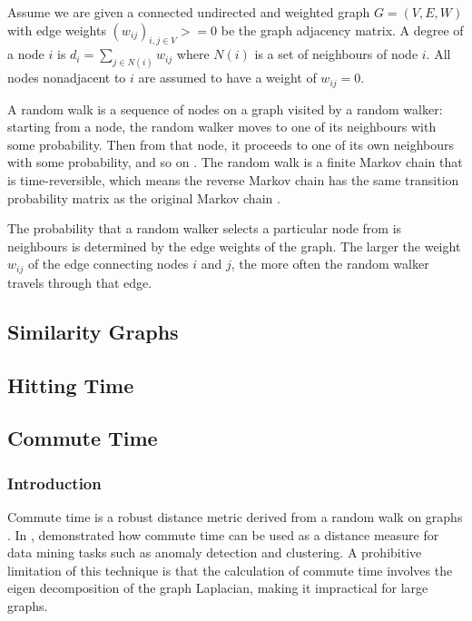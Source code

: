 Assume we are given a connected undirected and weighted graph $G=(V,E,W)$ with
edge weights $(w_{ij})_{i,j \in V}>=0$ be the graph adjacency matrix. A degree
of a node $i$ is $d_i=\sum_{j\in N(i)}w_{ij}$ where $N(i)$ is a set of
neighbours of node $i$. All nodes nonadjacent to $i$ are assumed to have a
weight of $w_{ij}=0$.

A random walk is a sequence of nodes on a graph visited by a random walker:
starting from a node, the random walker moves to one of its neighbours with some
probability. Then from that node, it proceeds to one of its own neighbours with
some probability, and so on \cite{Khoa:2012}. The random walk is a finite Markov
chain that is time-reversible, which means the reverse Markov chain has the same
transition probability matrix as the original Markov chain \cite{Lovasz:1996}.

The probability that a random walker selects a particular node from is
neighbours is determined by the edge weights of the graph. The larger the weight
$w_{ij}$ of the edge connecting nodes $i$ and $j$, the more often the random
walker travels through that edge.

\subsection{Similarity Graphs}
\label{similarityGraphs}

\subsection{Hitting Time}
\label{hittingTime}

\subsection{Commute Time}
\label{commuteTime}

\subsubsection{Introduction}
\label{commuteTime:introduction}
Commute time is a robust distance metric derived from a random walk on graphs
\cite{Khoa:2012}. In , \citeauthor{Khoa:2012} demonstrated
how commute time can be used as a distance measure for data mining tasks such as
anomaly detection and clustering. A prohibitive limitation of this technique is
that the calculation of commute time involves the eigen decomposition of the
graph Laplacian, making it impractical for large graphs.

